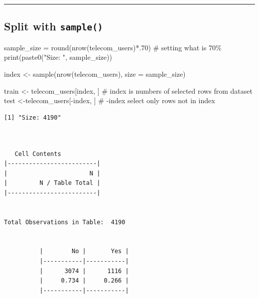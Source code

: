 \documentclass[
  letterpaper,
  DIV=11,
  numbers=noendperiod]{scrreprt}
\newenvironment{Shaded}{\begin{snugshade}}{\end{snugshade}}
\newcommand{\AttributeTok}[1]{\textcolor[rgb]{0.40,0.45,0.13}{#1}}
\newcommand{\CommentTok}[1]{\textcolor[rgb]{0.37,0.37,0.37}{#1}}
\newcommand{\DecValTok}[1]{\textcolor[rgb]{0.68,0.00,0.00}{#1}}
\newcommand{\FunctionTok}[1]{\textcolor[rgb]{0.28,0.35,0.67}{#1}}
\newcommand{\NormalTok}[1]{\textcolor[rgb]{0.00,0.23,0.31}{#1}}
\newcommand{\OtherTok}[1]{\textcolor[rgb]{0.00,0.23,0.31}{#1}}
\newcommand{\SpecialCharTok}[1]{\textcolor[rgb]{0.37,0.37,0.37}{#1}}
\newcommand{\StringTok}[1]{\textcolor[rgb]{0.13,0.47,0.30}{#1}}
\begin{document}
\begin{center}\rule{0.5\linewidth}{0.5pt}\end{center}

\subsection{\texorpdfstring{Split with
\texttt{sample()}}{Split with sample()}}\label{split-with-sample}

\begin{Shaded}
\begin{Highlighting}[]
\NormalTok{sample\_size }\OtherTok{=} \FunctionTok{round}\NormalTok{(}\FunctionTok{nrow}\NormalTok{(telecom\_users)}\SpecialCharTok{*}\NormalTok{.}\DecValTok{70}\NormalTok{) }\CommentTok{\# setting what is 70\%}
\FunctionTok{print}\NormalTok{(}\FunctionTok{paste0}\NormalTok{(}\StringTok{"Size: "}\NormalTok{, sample\_size))}

\NormalTok{index }\OtherTok{\textless{}{-}} \FunctionTok{sample}\NormalTok{(}\FunctionTok{nrow}\NormalTok{(telecom\_users), }\AttributeTok{size =}\NormalTok{ sample\_size)}
 
\NormalTok{train }\OtherTok{\textless{}{-}}\NormalTok{ telecom\_users[index, ] }\CommentTok{\# index is numbers of selected rows from dataset}
\NormalTok{test }\OtherTok{\textless{}{-}}\NormalTok{telecom\_users[}\SpecialCharTok{{-}}\NormalTok{index, ] }\CommentTok{\# {-}index select only rows not in index}
\end{Highlighting}
\end{Shaded}

\begin{verbatim}
[1] "Size: 4190"
\end{verbatim}

\begin{Shaded}
\end{Shaded}

\begin{verbatim}

 
   Cell Contents
|-------------------------|
|                       N |
|         N / Table Total |
|-------------------------|

 
Total Observations in Table:  4190 

 
          |        No |       Yes | 
          |-----------|-----------|
          |      3074 |      1116 | 
          |     0.734 |     0.266 | 
          |-----------|-----------|



 
\end{verbatim}
\end{document}
